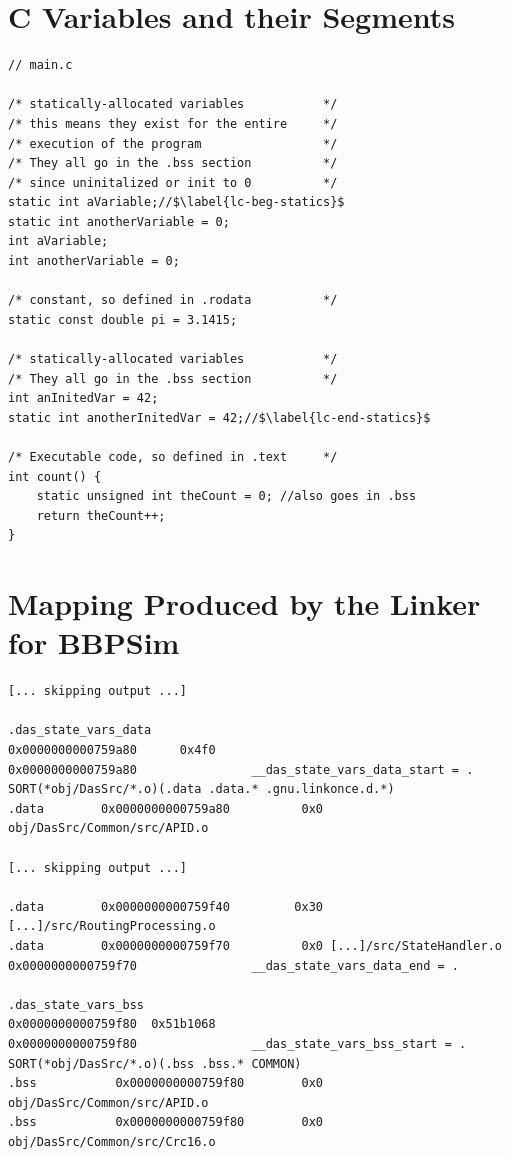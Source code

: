{
\chapter{C Variables and their Segments}\label{code:c-to-segments}

\begin{verbatim}
// main.c

/* statically-allocated variables       	*/
/* this means they exist for the entire 	*/
/* execution of the program             	*/
/* They all go in the .bss section 			*/
/* since uninitalized or init to 0 			*/
static int aVariable;//$\label{lc-beg-statics}$
static int anotherVariable = 0;
int aVariable;
int anotherVariable = 0;

/* constant, so defined in .rodata		 	*/
static const double pi = 3.1415;

/* statically-allocated variables       	*/
/* They all go in the .bss section 			*/
int anInitedVar = 42;
static int anotherInitedVar = 42;//$\label{lc-end-statics}$

/* Executable code, so defined in .text 	*/
int count() {
	static unsigned int theCount = 0; //also goes in .bss 
	return theCount++;
}
\end{verbatim}

\chapter{Mapping Produced by the Linker for BBPSim}\label{map:ld}

{\small
\begin{verbatim}
[... skipping output ...]

.das_state_vars_data
0x0000000000759a80      0x4f0
0x0000000000759a80                __das_state_vars_data_start = .
SORT(*obj/DasSrc/*.o)(.data .data.* .gnu.linkonce.d.*)
.data        0x0000000000759a80          0x0 obj/DasSrc/Common/src/APID.o

[... skipping output ...]

.data        0x0000000000759f40         0x30 [...]/src/RoutingProcessing.o
.data        0x0000000000759f70          0x0 [...]/src/StateHandler.o
0x0000000000759f70                __das_state_vars_data_end = .

.das_state_vars_bss
0x0000000000759f80  0x51b1068
0x0000000000759f80                __das_state_vars_bss_start = .
SORT(*obj/DasSrc/*.o)(.bss .bss.* COMMON)
.bss           0x0000000000759f80        0x0 obj/DasSrc/Common/src/APID.o
.bss           0x0000000000759f80        0x0 obj/DasSrc/Common/src/Crc16.o


\end{verbatim}}}

